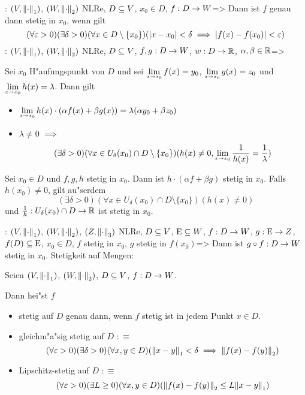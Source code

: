 \theorem:
  $(V,{\left\| \cdot\right\|}_1)$, $(W,{\left\| \cdot\right\|}_2)$ NLRe, $D\subseteq V$,
  $x_0\in D$, $f:D\to W$=>{
  Dann ist $f$ genau dann stetig in $x_0$, wenn gilt
  \[(\forall \varepsilon>0)(\exists \delta>0)(\forall x\in D\setminus\{x_0\})
    (|x-x_0|<\delta\implies |f(x)-f(x_0)|<\varepsilon)
    \]  
  }
\lessertheorem:
  $(V,{\left\| \cdot\right\|}_1)$, $(W,{\left\| \cdot\right\|}_2)$ NLRe, $D\subseteq V$,
  $f,g:D\to W$, $w:D\to\mathbb R$, $\alpha,\beta\in\mathbb R$=>
{
  \begin{stmts}
    \item 
      Sei $x_0$ H"aufungspunkt von $D$ und sei 
      $\limx \xnull f(x)=y_0$, 
      $\limx \xnull g(x)=z_0$ und  
      $\limx \xnull h(x)=\lambda$.
      Dann gilt
      \begin{itemize}
        \item $\limx \xnull h(x)\cdot(\alpha f(x)+\beta g(x))=
          \lambda(\alpha y_0+\beta z_0)$
        \item $\lambda\neq 0$ $\implies$ 
	  \[(\exists \delta>0)(\forall x\in U_\delta(x_0)\cap D\setminus\{x_0\})
            (h(x)\neq 0, \limx \xnull \frac 1 {h(x)} = \frac 1 \lambda)
            \]
        \end{itemize}
    \item
      Sei $x_0\in D$ und $f,g,h$ stetig in $x_0$. Dann ist
      $h\cdot(\alpha f+\beta g)$ stetig in $x_0$. 
      Falls $h(x_0)\neq 0$, gilt au"serdem 
      \[(\exists\delta>0)(\forall x\in U_\delta(x_0)\cap D\setminus\{x_0\})(h(x)\neq 0)
        \] 
      und $\frac 1 h:U_\delta(x_0)\cap D\to\mathbb R$ ist stetig in $x_0$.
    \end{stmts}
  }
\lessertheorem:
  $(V,{\left\| \cdot\right\|}_1)$, $(W,{\left\| \cdot\right\|}_2)$, $(Z,{\left\| \cdot\right\|}_3)$  NLRe, 
  $D\subseteq V$, ${\rm E}\subseteq W$, 
  $f:D\to W$, $g:{\rm E}\to Z$, $f(D)\subseteq{\rm E}$, $x_0\in D$, 
  $f$ stetig in $x_0$, $g$ stetig in $f(x_0)$=>{
  Dann ist $g\circ f:D\to W$ stetig in $x_0$.
  }
 Stetigkeit auf Mengen:{
  Seien $(V,{\left\| \cdot\right\|}_1)$, $(W,{\left\| \cdot\right\|}_2)$, $D\subseteq V$, 
  $f:D\to W$.
  
  Dann hei"st $f$
  \begin{itemize}
    \item stetig auf $D$ genau dann, wenn $f$ stetig ist 
      in jedem Punkt $x\in D$.
    \item gleichm"a"sig stetig auf $D$ $:\equiv$
      \[(\forall \varepsilon>0)(\exists \delta>0)(\forall x,y\in D)
        ({\left\| x-y\right\|}_1<\delta \implies {\left\| f(x)-f(y)\right\|}_2)
        \]
    \item Lipschitz-stetig auf $D$ $:\equiv$
      \[(\forall \varepsilon>0)(\exists L\geq0)(\forall x,y\in D)
        ({\left\| f(x)-f(y)\right\|}_2\leq L{\left\| x-y\right\|}_1)
        \]
    \end{itemize}
  }
